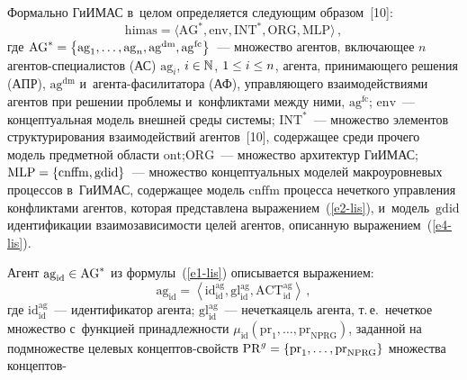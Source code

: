 \begin{multicols}{2}
  Формально \mbox{ГиИМАС} в~целом определяется следующим 
образом~[10]:
  \begin{equation}
  \mathrm{himas} =\langle \mathrm{AG}^*, 
\mathrm{env},\mathrm{INT}^*,\mathrm{ORG}, \mathrm{MLP}\rangle\,,
  \label{e1-lis}
  \end{equation}
где $\mathrm{AG}^*\hm= \left\{ \mathrm{ag}_1, \ldots , \mathrm{ag}_n, 
\mathrm{ag}^{\mathrm{dm}}, \mathrm{ag}^{\mathrm{fc}}\right\}$~--- множество агентов, 
включающее $n$ аген\-тов-спе\-циа\-ли\-стов (АС) $\mathrm{ag}_i$, $i\hm\in 
\mathbb{N}$, $1\hm\leq i\hm\leq n$, агента, принимающего решения (АПР), 
$\mathrm{ag}^{\mathrm{dm}}$ и~аген\-та-фа\-си\-ли\-та\-то\-ра (АФ), управ\-ля\-юще\-го 
взаимодействиями агентов при решении проб\-ле\-мы и~конфликтами между 
ними, $\mathrm{ag}^{\mathrm{fc}}$; $\mathrm{env}$~--- концептуальная модель 
внешней среды сис\-те\-мы; $\mathrm{INT}^*$~--- множество элементов 
структурирования взаимодействий агентов~[10], содержащее среди прочего 
модель предметной об\-ласти $\mathrm{ont}$;\linebreak $\mathrm{ORG}$~--- множество архитектур 
\mbox{ГиИМАС}; $\mathrm{MLP}\hm= \{ \mathrm{cnffm}, \mathrm{gdid}\}$~--- множество 
концептуальных моделей макроуровневых процессов в~\mbox{ГиИМАС},\linebreak 
содержащее модель $\mathrm{cnffm}$ процесса нечеткого управ\-ле\-ния конфликтами 
агентов, которая представлена выражением~(\ref{e2-lis}), и~модель~$\mathrm{gdid}$ 
идентификации взаимозависимости целей агентов, описанную 
выражением~(\ref{e4-lis}). 

  Агент $\mathrm{ag}_{\mathrm{id}}\hm\in \mathrm{AG}^*$ из формулы~(\ref{e1-lis}) 
описывается выражением:
  $$
  \mathrm{ag}_{\mathrm{id}} =\left\langle \mathrm{id}_{\mathrm{id}}^{\mathrm{ag}}, \mathrm{gl}_{\mathrm{id}}^{\mathrm{ag}}, 
\mathrm{ACT}_{\mathrm{id}}^{\mathrm{ag}} \right\rangle\,,
  $$
где $\mathrm{id}_{\mathrm{id}}^{\mathrm{ag}}$~--- идентификатор агента; $\mathrm{gl}_{\mathrm{id}}^{\mathrm{ag}}$~--- нечеткая\linebreak цель 
агента, т.\,е.\ нечеткое множество с~функцией принадлежности 
$\mu_{\mathrm{id}}(\mathrm{pr}_1, \ldots , \mathrm{pr}_{\mathrm{NPRG}})$, заданной на 
подмножестве целевых кон\-цеп\-тов-свойств
$\mathrm{PR}^g\hm= \{ 
\mathrm{pr}_1, \ldots , \mathrm{pr}_{\mathrm{NPRG}}\}$ множества  
кон\-цеп\-тов-\linebreak\vspace*{-12pt}

\columnbreak


\end{multicols}
